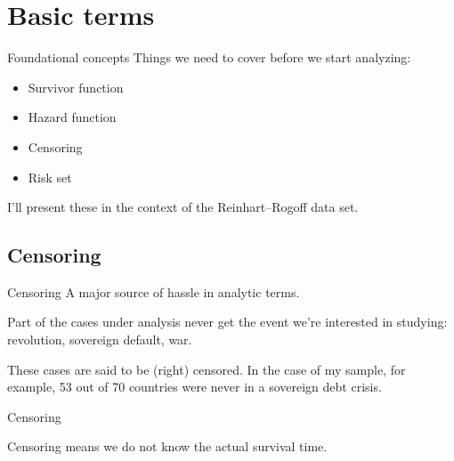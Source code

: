 \documentclass[12pt,english,pdf,xcolor=dvipsnames,aspectratio=169]{beamer}\usepackage[]{graphicx}\usepackage[]{xcolor}
\begin{document}
\section{Basic terms}
\begin{frame}{Foundational concepts}
Things we need to cover before we start analyzing:

\begin{itemize}
\item Survivor function
\item Hazard function
\item Censoring
\item Risk set
\end{itemize}

I'll present these in the context of the Reinhart--Rogoff data set.
\end{frame}





\subsection{Censoring}
\begin{frame}{Censoring}
A major source of hassle in analytic terms.\bigskip

Part of the cases under analysis never get the event we're interested in studying: revolution, sovereign default, war.\bigskip

These cases are said to be (right) censored. In the case of my sample, for example, 53 out of 70 countries were never in a sovereign debt crisis.
\end{frame}



\begin{frame}{Censoring}

\begin{figure}
\centering
{}
\end{figure}

Censoring means we do not know the actual survival time.
\end{frame}
\end{document}
